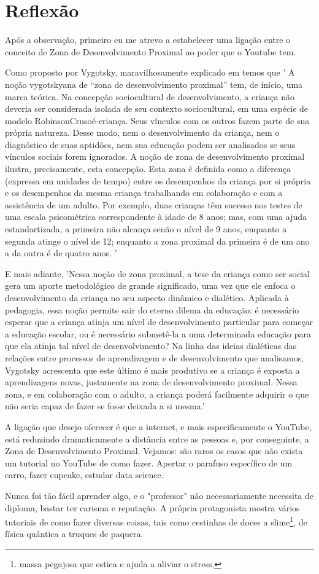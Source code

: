 \section{Reflexão}

Após a observação, primeiro eu me atrevo a estabelecer uma ligação entre o conceito de Zona de Desenvolvimento Proximal ao poder que o Youtube tem.

Como proposto por Vygotsky, maravilhosamente explicado em  temos que '
A noção vygotskyana de “zona de desenvolvimento proximal” tem, de início, uma marca teórica. Na concepção sociocultural de desenvolvimento, a criança não deveria ser considerada isolada de seu contexto sociocultural, em uma espécie de modelo RobinsonCrusoé-criança. Seus vínculos com os outros fazem parte de sua própria natureza. Desse modo, nem o desenvolvimento da criança, nem o diagnóstico de suas aptidões, nem sua educação podem ser analisados se seus vínculos sociais forem ignorados. A noção de zona de desenvolvimento proximal ilustra, precisamente, esta concepção. Esta zona é definida como a diferença (expressa em unidades de tempo) entre os desempenhos da criança por si própria e os desempenhos da mesma criança trabalhando em colaboração e com a assistência de um adulto. Por exemplo, duas crianças têm sucesso nos testes de uma escala psicométrica correspondente à idade de 8 anos; mas, com uma ajuda estandartizada, a primeira não alcança senão o nível de 9 anos, enquanto a segunda atinge o nível de 12; enquanto a zona proximal da primeira é de um ano a da outra é de quatro anos. '

E mais adiante, 'Nessa noção de zona proximal, a tese da criança como ser social gera um aporte metodológico de grande significado, uma vez que ele enfoca o desenvolvimento da criança no seu aspecto dinâmico e dialético. Aplicada à pedagogia, essa noção permite sair do eterno dilema da educação: é necessário esperar que a criança atinja um nível de desenvolvimento particular para começar a educação escolar, ou é necessário submetê-la a uma determinada educação para que ela atinja tal nível de desenvolvimento? Na linha das ideias dialéticas das relações entre processos de aprendizagem e de desenvolvimento que analisamos, Vygotsky acrescenta que este último é mais produtivo se a criança é exposta a aprendizagens novas, justamente na zona de desenvolvimento proximal. Nessa zona, e em colaboração com o adulto, a criança poderá facilmente adquirir o que não seria capaz de fazer se fosse deixada a si mesma.'

A ligação que desejo oferecer é que a internet, e mais especificamente o YouTube, está reduzindo dramaticamente a distância entre as pessoas e, por conseguinte, a Zona de Desenvolvimento Proximal. Vejamos: são raros os casos que não exista um tutorial no YouTube de como fazer. Apertar o parafuso específico de um carro, fazer cupcake, estudar data science.

Nunca foi tão fácil aprender algo, e o "professor" não necessariamente necessita de diploma, bastar ter carisma e reputação. A própria protagonista mostra vários tutoriais de como fazer diversas coisas, tais como cestinhas de doces a slime\footnote{ massa pegajosa que estica e ajuda a aliviar o stress.}, de física quântica a truques de paquera.